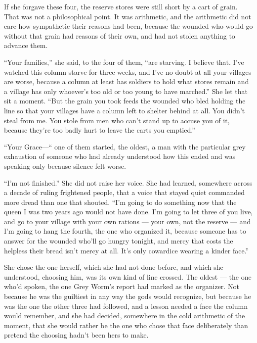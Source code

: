 If she forgave these four, the reserve stores were still short by a cart of grain. That was not a philosophical point. It was arithmetic, and the arithmetic did not care how sympathetic their reasons had been, because the wounded who would go without that grain had reasons of their own, and had not stolen anything to advance them.

“Your families,” she said, to the four of them, “are starving. I believe that. I’ve watched this column starve for three weeks, and I’ve no doubt at all your villages are worse, because a column at least has soldiers to hold what stores remain and a village has only whoever’s too old or too young to have marched.” She let that sit a moment. “But the grain you took feeds the wounded who bled holding the line so that your villages have a column left to shelter behind at all. You didn’t steal from me. You stole from men who can’t stand up to accuse you of it, because they’re too badly hurt to leave the carts you emptied.”

“Your Grace—“ one of them started, the oldest, a man with the particular grey exhaustion of someone who had already understood how this ended and was speaking only because silence felt worse.

“I’m not finished.” She did not raise her voice. She had learned, somewhere across a decade of ruling frightened people, that a voice that stayed quiet commanded more dread than one that shouted. “I’m going to do something now that the queen I was two years ago would not have done. I’m going to let three of you live, and go to your village with your own rations — your own, not the reserve — and I’m going to hang the fourth, the one who organized it, because someone has to answer for the wounded who’ll go hungry tonight, and mercy that costs the helpless their bread isn’t mercy at all. It’s only cowardice wearing a kinder face.”

\sceneBreak

She chose the one herself, which she had not done before, and which she understood, choosing him, was its own kind of line crossed. The oldest — the one who’d spoken, the one Grey Worm’s report had marked as the organizer. Not because he was the guiltiest in any way the gods would recognize, but because he was the one the other three had followed, and a lesson needed a face the column would remember, and she had decided, somewhere in the cold arithmetic of the moment, that she would rather be the one who chose that face deliberately than pretend the choosing hadn’t been hers to make.

